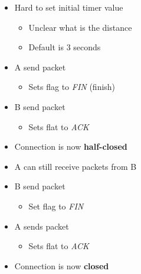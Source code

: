 \begin{itemize}
\begin{itemize}
\begin{itemize}
                    \item Hard to set initial timer value
                        \begin{itemize}
                            \item Unclear what is the distance
                            \item Default is $3$ seconds
                        \end{itemize}
                \end{itemize}
        \end{itemize}
        \begin{itemize}
                \begin{itemize}
                    \item A send packet
                        \begin{itemize}
                            \item Sets flag to \textit{FIN} (finish)
                        \end{itemize}
                    \item B send packet
                        \begin{itemize}
                            \item Sets flat to \textit{ACK}
                        \end{itemize}
                    \item Connection is now \textbf{half-closed}
                    \item A can still receive packets from B
                    \item B send packet
                        \begin{itemize}
                            \item Set flag to \textit{FIN}
                        \end{itemize}
                    \item A sends packet
                        \begin{itemize}
                            \item Sets flat to \textit{ACK}
                        \end{itemize}
                    \item Connection is now \textbf{closed}
                \end{itemize}
                \begin{itemize}

\end{itemize}
\end{itemize}
\end{itemize}
